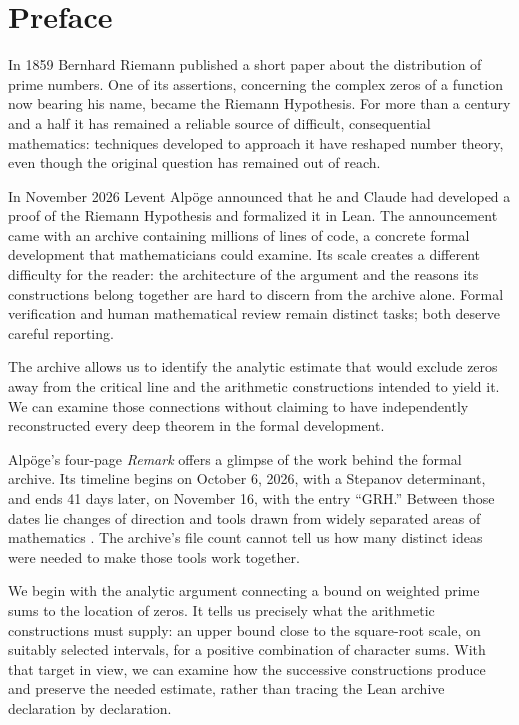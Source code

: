 \documentclass[11pt,openany,oneside]{scrbook}
\theoremstyle{definition}
\theoremstyle{remark}
\begin{document}
\chapter*{Preface}
In 1859 Bernhard Riemann published a short paper about the distribution of prime numbers. One of its assertions, concerning the complex zeros of a function now bearing his name, became the Riemann Hypothesis. For more than a century and a half it has remained a reliable source of difficult, consequential mathematics: techniques developed to approach it have reshaped number theory, even though the original question has remained out of reach.

In November 2026 Levent Alp\"oge announced that he and Claude had developed a proof of the Riemann Hypothesis and formalized it in Lean. The announcement came with an archive containing millions of lines of code, a concrete formal development that mathematicians could examine. Its scale creates a different difficulty for the reader: the architecture of the argument and the reasons its constructions belong together are hard to discern from the archive alone. Formal verification and human mathematical review remain distinct tasks; both deserve careful reporting.

The archive allows us to identify the analytic estimate that would exclude zeros away from the critical line and the arithmetic constructions intended to yield it. We can examine those connections without claiming to have independently reconstructed every deep theorem in the formal development.

Alp\"oge's four-page \emph{Remark} offers a glimpse of the work behind the formal archive. Its timeline begins on October 6, 2026, with a Stepanov determinant, and ends 41 days later, on November 16, with the entry ``GRH.'' Between those dates lie changes of direction and tools drawn from widely separated areas of mathematics \parencite{Alpoege2026Remark}. The archive's file count cannot tell us how many distinct ideas were needed to make those tools work together.

We begin with the analytic argument connecting a bound on weighted prime sums to the location of zeros. It tells us precisely what the arithmetic constructions must supply: an upper bound close to the square-root scale, on suitably selected intervals, for a positive combination of character sums. With that target in view, we can examine how the successive constructions produce and preserve the needed estimate, rather than tracing the Lean archive declaration by declaration.
\end{document}
